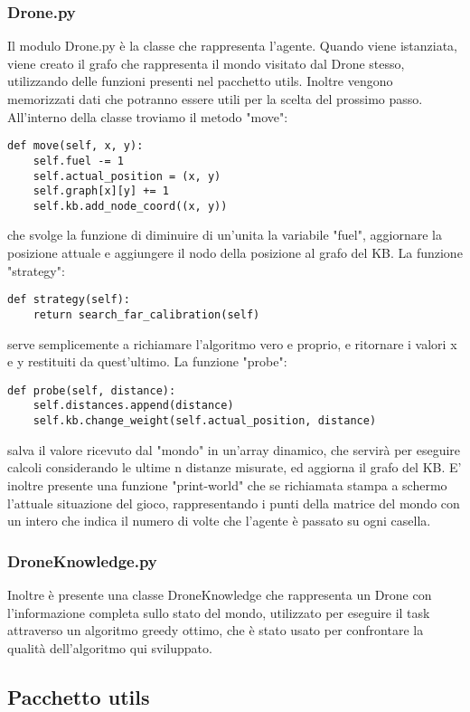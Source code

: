 \subsubsection{Drone.py}
Il modulo Drone.py è la classe che rappresenta l'agente. Quando viene istanziata, viene creato il grafo che rappresenta il mondo visitato dal Drone stesso, utilizzando delle funzioni presenti nel pacchetto utils. Inoltre vengono memorizzati dati che potranno essere utili per la scelta del prossimo passo. 
All'interno della classe troviamo il metodo "move":
\begin{verbatim}
def move(self, x, y):
    self.fuel -= 1
    self.actual_position = (x, y)
    self.graph[x][y] += 1
    self.kb.add_node_coord((x, y))
\end{verbatim}
che svolge la funzione di diminuire di un'unita la variabile "fuel", aggiornare la posizione attuale e aggiungere il nodo della posizione al grafo del KB. 
La funzione "strategy":
\begin{verbatim}
def strategy(self):
    return search_far_calibration(self)
\end{verbatim}
serve semplicemente a richiamare l'algoritmo vero e proprio, e ritornare i valori x e y restituiti da quest'ultimo. 
La funzione "probe":
\begin{verbatim}
def probe(self, distance):
    self.distances.append(distance)
    self.kb.change_weight(self.actual_position, distance)
\end{verbatim}
salva il valore ricevuto dal "mondo" in un'array dinamico, che servirà per eseguire calcoli considerando le ultime n distanze misurate, ed aggiorna il grafo del KB. 
E' inoltre presente una funzione "print-world" che se richiamata stampa a schermo l'attuale situazione del gioco, rappresentando i punti della matrice del mondo con un intero che indica il numero di volte che l'agente è passato su ogni casella.

\subsubsection{DroneKnowledge.py}
Inoltre è presente una classe DroneKnowledge che rappresenta un Drone con l'informazione completa sullo stato del mondo, utilizzato per eseguire il task attraverso un algoritmo greedy ottimo, che è stato usato per confrontare la qualità dell'algoritmo qui sviluppato.

\subsection{Pacchetto utils}

